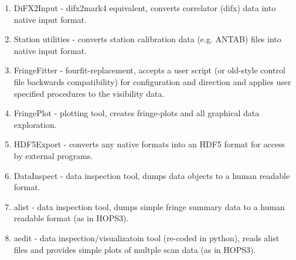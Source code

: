 \documentclass[hidelinks]{article}
\begin{document}
\begin{enumerate}
 \item DiFX2Input  - difx2mark4 equivalent, converts correlator (difx) data into native input format.
 \item Station utilities  - converts station calibration data (e.g. ANTAB) files into native input format.
 \item FringeFitter - fourfit-replacement, accepts a user script (or old-style control file backwards compatibility) for configuration and direction and applies user specified procedures to the visibility data.
 \item FringePlot  - plotting tool, creates fringe-plots and all graphical data exploration.
 \item HDF5Export  - converts any native formats into an HDF5 format for access by external programs.
 \item DataInspect - data inspection tool, dumps data objects to a human readable format.
 \item alist - data inspection tool, dumps simple fringe summary data to a human readable format (as in HOPS3).
 \item aedit - data inspection/visualizatoin tool (re-coded in python), reads alist files and provides simple plots of multple scan data (as in HOPS3).
 \end{enumerate}
\end{document}
